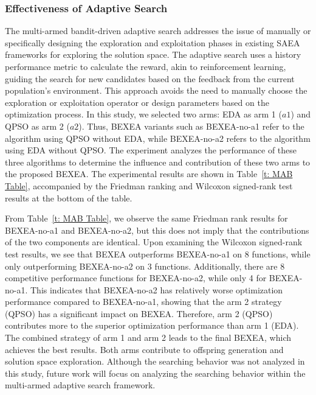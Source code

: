 \documentclass[review]{elsarticle}
\begin{document}
\subsubsection{Effectiveness of Adaptive Search}
The multi-armed bandit-driven adaptive search addresses the issue of manually or specifically designing the exploration and exploitation phases in existing SAEA frameworks for exploring the solution space. The adaptive search uses a history performance metric to calculate the reward, akin to reinforcement learning, guiding the search for new candidates based on the feedback from the current population's environment. This approach avoids the need to manually choose the exploration or exploitation operator or design parameters based on the optimization process. In this study, we selected two arms: EDA as arm 1 ($a1$) and QPSO as arm 2 ($a2$). Thus, BEXEA variants such as BEXEA-no-a1 refer to the algorithm using QPSO without EDA, while BEXEA-no-a2 refers to the algorithm using EDA without QPSO. The experiment analyzes the performance of these three algorithms to determine the influence and contribution of these two arms to the proposed BEXEA. The experimental results are shown in Table~\ref{t: MAB Table}, accompanied by the Friedman ranking and Wilcoxon signed-rank test results at the bottom of the table.

From Table~\ref{t: MAB Table}, we observe the same Friedman rank results for BEXEA-no-a1 and BEXEA-no-a2, but this does not imply that the contributions of the two components are identical. Upon examining the Wilcoxon signed-rank test results, we see that BEXEA outperforms BEXEA-no-a1 on 8 functions, while only outperforming BEXEA-no-a2 on 3 functions. Additionally, there are 8 competitive performance functions for BEXEA-no-a2, while only 4 for BEXEA-no-a1. This indicates that BEXEA-no-a2 has relatively worse optimization performance compared to BEXEA-no-a1, showing that the arm 2 strategy (QPSO) has a significant impact on BEXEA. Therefore, arm 2 (QPSO) contributes more to the superior optimization performance than arm 1 (EDA). The combined strategy of arm 1 and arm 2 leads to the final BEXEA, which achieves the best results. Both arms contribute to offspring generation and solution space exploration. Although the searching behavior was not analyzed in this study, future work will focus on analyzing the searching behavior within the multi-armed adaptive search framework.
\end{document}
